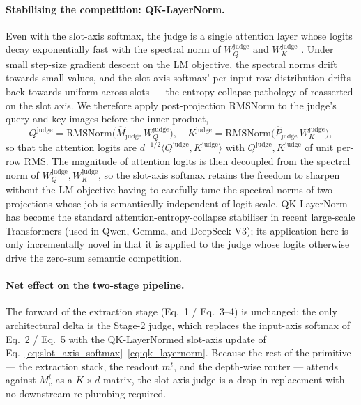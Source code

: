 \documentclass[11pt, a4paper]{article}
\begin{document}
\paragraph{Stabilising the competition: QK-LayerNorm.} Even with the slot-axis softmax, the judge is a single attention layer whose logits decay exponentially fast with the spectral norm of $W_Q^{\text{judge}}$ and $W_K^{\text{judge}}$ \cite{zhai2023sigmareparam}. Under small step-size gradient descent on the LM objective, the spectral norms drift towards small values, and the slot-axis softmax' per-input-row distribution drifts back towards uniform across slots --- the entropy-collapse pathology of \cite{zhai2023sigmareparam} reasserted on the slot axis. We therefore apply post-projection RMSNorm to the judge's query and key images before the inner product,
\begin{equation}
    Q^{\text{judge}} = \mathrm{RMSNorm}\bigl(\hat{M}_{\text{judge}}\, W_Q^{\text{judge}}\bigr),
    \quad
    K^{\text{judge}} = \mathrm{RMSNorm}\bigl(\hat{P}_{\text{judge}}\, W_K^{\text{judge}}\bigr),
    \label{eq:qk_layernorm}
\end{equation}
so that the attention logits are $d^{-1/2}\langle Q^{\text{judge}}, K^{\text{judge}}\rangle$ with $Q^{\text{judge}}, K^{\text{judge}}$ of unit per-row RMS. The magnitude of attention logits is then decoupled from the spectral norm of $W_Q^{\text{judge}}, W_K^{\text{judge}}$, so the slot-axis softmax retains the freedom to sharpen without the LM objective having to carefully tune the spectral norms of two projections whose job is semantically independent of logit scale. QK-LayerNorm has become the standard attention-entropy-collapse stabiliser in recent large-scale Transformers (used in Qwen, Gemma, and DeepSeek-V3); its application here is only incrementally novel in that it is applied to the judge whose logits otherwise drive the zero-sum semantic competition.

\paragraph{Net effect on the two-stage pipeline.} The forward of the extraction stage (Eq.~1 / Eq.~3--4) is unchanged; the only architectural delta is the Stage-2 judge, which replaces the input-axis softmax of Eq.~2 / Eq.~5 with the QK-LayerNormed slot-axis update of Eq.~\ref{eq:slot_axis_softmax}--\ref{eq:qk_layernorm}. Because the rest of the primitive --- the extraction stack, the readout $m^t$, and the depth-wise router --- attends against $M_{\text{c}}^{t}$ as a $K\!\times\!d$ matrix, the slot-axis judge is a drop-in replacement with no downstream re-plumbing required.
\end{document}
